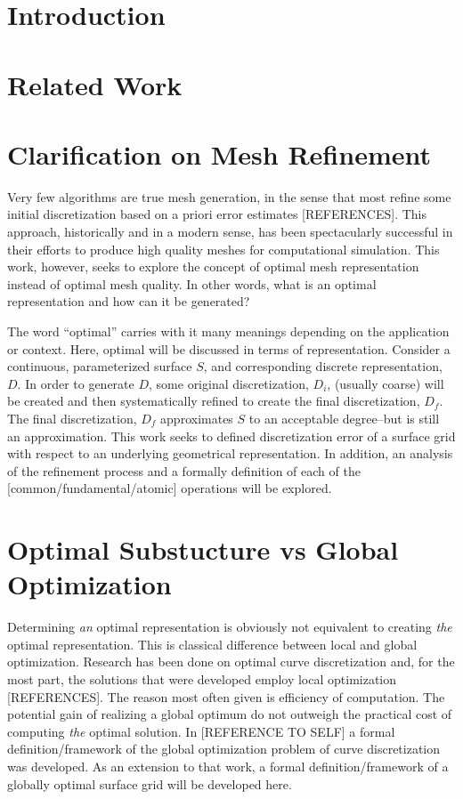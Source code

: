 \documentclass[11pt]{article}
\begin{document}
\section{Introduction}
\section{Related Work}
\section{Clarification on Mesh Refinement}
Very few algorithms are true mesh generation, in the sense that most
refine some initial discretization based on a priori error estimates
[REFERENCES]. This approach, historically and in a modern sense, has
been spectacularly successful in their efforts to produce high quality
meshes for computational simulation. This work, however, seeks to
explore the concept of optimal mesh representation instead of optimal
mesh quality. In other words, what is an optimal representation and how
can it be generated?

The word ``optimal'' carries with it many meanings depending on the application or context. Here, optimal will be discussed in terms of representation. Consider a continuous, parameterized surface $S$, and corresponding discrete representation, $D$. In order to generate $D$, some original discretization, $D_i$, (usually coarse) will be created and then systematically refined to create the final discretization, $D_f$. The final discretization, $D_f$ approximates $S$ to an acceptable degree--but is still an approximation. This work seeks to defined discretization error of a surface grid with respect to an underlying geometrical representation. In addition, an analysis of the refinement process and a formally definition of each of the [common/fundamental/atomic] operations will be explored.

\section{Optimal Substucture vs Global Optimization}
Determining {\it an} optimal representation is obviously not equivalent to creating {\it the} optimal representation. This is classical difference between local and global optimization. Research has been done on optimal curve discretization and, for the most part, the solutions that were developed employ local optimization [REFERENCES]. The reason most often given is efficiency of computation. The potential gain of realizing a global optimum do not outweigh the practical cost of computing {\it the} optimal solution. In [REFERENCE TO SELF] a formal definition/framework of the global optimization problem of curve discretization was developed. As an extension to that work, a formal definition/framework of a globally optimal surface grid will be developed here.
\end{document}
